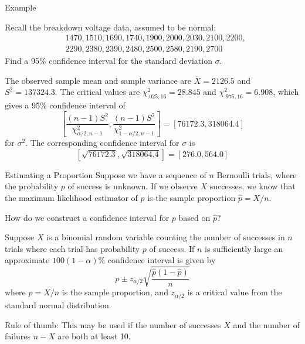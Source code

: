 \documentclass{beamer}
\begin{document}
\begin{frame}{Example}
\begin{block}{}
Recall the breakdown voltage data,  assumed to be normal:
\begin{align*}
&1470, 1510, 1690, 1740, 1900, 2000, 2030, 2100, 2200, \\
& 2290, 2380, 2390, 2480, 2500, 2580, 2190, 2700
\end{align*}
Find a 95\% confidence interval for the standard deviation $\sigma$.
\end{block}

\pause The observed sample mean and sample variance are $\overline X=2126.5$ and $S^2=137324.3$. \pause The critical values are $\chi^2_{.025,16}=28.845$ and $\chi^2_{.975,16}=6.908$, \pause which gives a 95\% confidence interval of
$$\left[\frac{(n-1)S^2}{\chi^2_{\alpha/2,n-1}}, \frac{(n-1)S^2}{\chi^2_{1-\alpha/2,n-1}}\right]
= [76172.3, 318064.4]$$
for $\sigma^2$. \pause The corresponding confidence interval for $\sigma$ is
$$[\sqrt{76172.3}, \sqrt{318064.4}] = [276.0, 564.0]$$

\end{frame}


\begin{frame}{Estimating a Proportion}
Suppose we have a sequence of $n$ Bernoulli trials, where the probability $p$ of success is unknown. If we observe $X$ successes, we know that the maximum likelihood estimator of $p$ is the sample proportion $\hat p=X/n$. 

\vspace{.2cm}\pause How do we construct a confidence interval for $p$ based on $\hat p$?
\pause \begin{block}{}Suppose $X$ is a binomial random variable counting the number of successes in $n$ trials where each trial has probability $p$ of success. If $n$ is sufficiently large an approximate $100(1-\alpha)\%$ confidence interval is given by
$$\hat p \pm z_{\alpha/2}\sqrt{\frac{\hat p(1-\hat p)}n}$$
where $\hat p=X/n$ is the sample proportion, and $z_{\alpha/2}$ is a critical value from the standard normal distribution.
\end{block}
\pause Rule of thumb: This may be used if the number of successes $X$ and the number of failures $n-X$ are both at least 10.
\end{frame}
\end{document}
